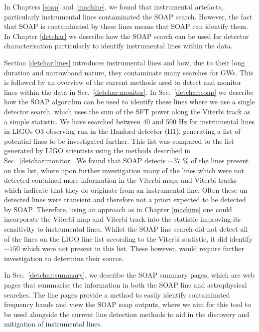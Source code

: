 \bigskip

In Chapters \ref{soap} and \ref{machine}, we found that instrumental artefacts,
particularly instrumental lines contaminated the SOAP search.  However, the
fact that SOAP is contaminated by these lines means that SOAP can identify
them.  In Chapter \ref{detchar} we describe how the SOAP search can be used for
detector characterisation particularly to identify instrumental lines within
the data.

Section \ref{detchar:lines} introduces instrumental lines and how, due to their
long duration and narrowband nature, they contaminate many searches for
\glspl{GW}.  This is followed by an overview of the current methods used to
detect and monitor lines within the data in Sec.~\ref{detchar:monitor}.  In
Sec.~\ref{detchar:soap} we describe how the SOAP algorithm can be used to
identify these lines where we use a single
detector search, which uses the sum of the \gls{SFT} power along the Viterbi track as a simple statistic.  We have searched
between 40 and 500 Hz for instrumental lines in \glspl{LIGO} O3 observing run in the Hanford detector (H1), generating
a list of potential lines to be investigated further.  This list was compared
to the list generated by \gls{LIGO} scientists using the methods described in
Sec.~\ref{detchar:monitor}.  We found that SOAP detects $\sim 37$ \% of the
lines present on this list, where upon further investigation many of the lines
which were not detected contained more information in the Viterbi maps and
Viterbi tracks which indicate that they do originate from an instrumental
line. Often these un-detected lines were transient and therefore not a priori expected to be detected by SOAP. 
Therefore, using an approach as in Chapter \ref{machine} one could incorporate
the Viterbi map and Viterbi track into the statistic improving its sensitivity
to instrumental lines.  Whilst the SOAP line search did not detect all of the
lines on the \gls{LIGO} line list according to the Viterbi statistic, it did
identify $\sim 150$ which were not present in this list.  These however, would
require further investigation to determine their source.

In Sec.~\ref{detchar:summary}, we describe the SOAP summary pages, which are
web pages that summarise the information in both the SOAP line and
astrophysical searches.  The line pages provide a method to easily identify
contaminated frequency bands and view the SOAP soap outputs, where we aim for
this tool to be used alongside the current line detection methods to aid in the
discovery and mitigation of instrumental lines.

